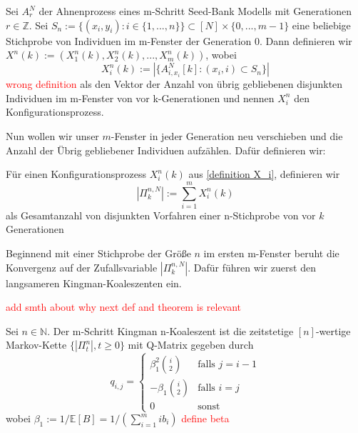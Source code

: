 \begin{Definition}
    \label{definition X_i}
    Sei $A^{N}_r$ der Ahnenprozess eines m-Schritt Seed-Bank Modells mit Generationen $r \in \mathbb{Z}$. Sei $S_n:= \{(x_i,y_i): i \in \{1,...,n\}\} \subset [N]\times \{0,...,m-1\}$ eine beliebige Stichprobe von Individuen im m-Fenster der Generation 0. Dann definieren wir $X^n(k):= (X^n_1(k),X^n_2(k),...,X^n_m(k))$, wobei 
\[
    X^n_i(k) := |\{A^N_{i,x_i}[k]: (x_i,i) \subset S_n\}|
\]
\textcolor{red}{wrong definition}
als den Vektor der Anzahl von übrig gebliebenen disjunkten Individuen im m-Fenster von vor k-Generationen und nennen $X^n_i$ den Konfigurationsprozess. 
\end{Definition}
Nun wollen wir unser $m$-Fenster in jeder Generation neu verschieben und die Anzahl der Übrig gebliebener Individuen aufzählen. Dafür definieren wir:
\begin{Definition}
    \label{def pi process}
    Für einen Konfigurationsprozess $X^n_i(k)$ aus \ref{definition X_i}, definieren wir 
    \[
        |\Pi_k^{n,N}| := \sum_{i = 1}^m X^n_i(k)
    \]
    als Gesamtanzahl von disjunkten Vorfahren einer n-Stichprobe von vor $k$ Generationen
\end{Definition}
Beginnend mit einer Stichprobe der Größe $n$ im ersten m-Fenster beruht die Konvergenz auf der Zufallsvariable $|\Pi^{n,N}_k|$. Dafür führen wir zuerst den langsameren Kingman-Koaleszenten ein.


\textcolor{red}{add smth about why next def and theorem is relevant}
\begin{Definition}
    Sei $n \in \mathbb{N}$. Der m-Schritt Kingman n-Koaleszent ist die zeitstetige $[n]$-wertige Markov-Kette $\{|\Pi^n_t|, t \geq 0\}$ mit Q-Matrix gegeben durch
    \begin{equation}
        q_{i,j} =
        \begin{cases}
            \beta_1^2\binom{i}{2} & \text{falls } j = i-1  \\
            -\beta_1\binom{i}{2} & \text{falls } i = j\\
            0  & \text{sonst}
       \end{cases}
    \end{equation}
wobei $\beta_1 := 1 / \mathbb{E}[B] = 1 / (\sum_{i=1}^{m}ib_i)$
\textcolor{red}{define beta}
\end{Definition}

